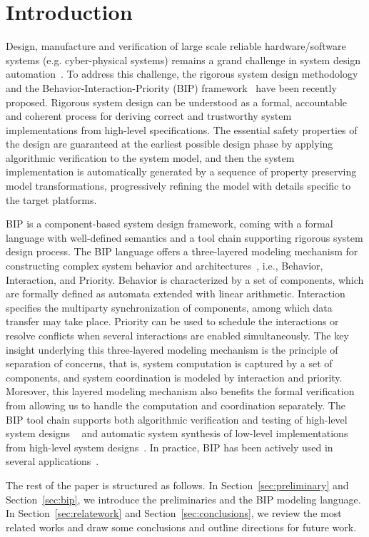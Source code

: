 
\section{Introduction}
\label{introduction}


Design, manufacture and verification of large scale reliable hardware/software
    systems (e.g. cyber-physical systems) remains a grand challenge in system
    design automation~\cite{sifakis2015}.
To address this challenge, the rigorous system design
    methodology~\cite{sifakis13} and the Behavior-Interaction-Priority (BIP)
    framework~\cite{bip11} have been recently proposed.
%
Rigorous system design can be understood as a formal,
 accountable and coherent process for
 deriving correct and trustworthy system implementations
 from high-level specifications.
%
The essential safety properties of the design are guaranteed
 at the earliest possible design phase
 by applying algorithmic verification to the system model,
 and then the system implementation is automatically generated
 by a sequence of property preserving model transformations,
 progressively refining the model with details specific to the target platforms.


BIP is a component-based system design framework,
 coming with a formal language with well-defined semantics
 and a tool chain supporting rigorous system design process.
 The BIP language offers a three-layered modeling mechanism for
  constructing complex system behavior and architectures~\cite{concur16},
  i.e.,  Behavior, Interaction, and Priority.
%
Behavior is characterized by a set of components,
 which are formally defined as automata extended with linear arithmetic.
%
Interaction specifies the multiparty synchronization of components,
 among which data transfer may take place.
%
Priority can be used to schedule the interactions or resolve conflicts
 when several interactions are enabled simultaneously.
%
The key insight underlying this three-layered modeling mechanism is
 the principle of separation of concerns,
 that is, system computation is captured by a set of components,
 and system coordination is modeled by interaction and priority.
%
Moreover, this layered modeling mechanism also benefits
 the formal verification from allowing us to handle the computation and coordination separately.
%
The BIP tool chain supports both algorithmic verification and testing of high-level system designs
 ~\cite{dfinder10,atva15,tgc15}
 and automatic system synthesis of low-level implementations from high-level system designs~\cite{bip-emsoft10}.
 In practice, BIP has been actively used in several applications~\cite{bipapplication12a,bipapplication18}.


The rest of the paper is structured as follows.
%
In Section~\ref{sec:preliminary} and Section~\ref{sec:bip},
 we introduce the preliminaries and the BIP modeling language.
%
In Section~\ref{sec:relatework} and Section~\ref{sec:conclusions},
 we review the most related works and draw some conclusions and outline directions for future work.

